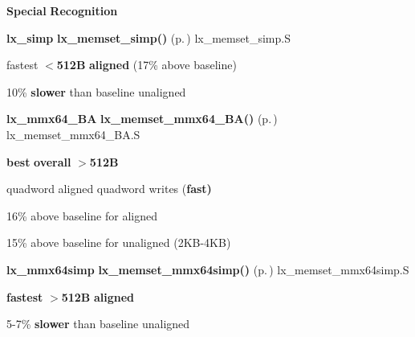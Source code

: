 {\bf Special} {\bf Recognition}\begin{CompactItemize}
\item 
{\bf lx\_\-simp} {\bf lx\_\-memset\_\-simp()} {\rm (p.\,\pageref{memset_2def__test_8h_a6})} lx\_\-memset\_\-simp.S\begin{CompactItemize}
\item 
fastest {\bf $<$512B} {\bf aligned} (17\% above baseline) \item 
10\% {\bf slower} than baseline unaligned\end{CompactItemize}
\item 
{\bf lx\_\-mmx64\_\-BA} {\bf lx\_\-memset\_\-mmx64\_\-BA()} {\rm (p.\,\pageref{memset_2def__test_8h_a12})} lx\_\-memset\_\-mmx64\_\-BA.S \begin{CompactItemize}
\item 
{\bf best} {\bf overall} {\bf $>$512B}\item 
quadword aligned quadword writes ({\bf fast)}\item 
16\% above baseline for aligned\item 
15\% above baseline for unaligned (2KB-4KB)\end{CompactItemize}
\item 
{\bf lx\_\-mmx64simp} {\bf lx\_\-memset\_\-mmx64simp()} {\rm (p.\,\pageref{memset_2def__test_8h_a11})} lx\_\-memset\_\-mmx64simp.S \begin{CompactItemize}
\item 
{\bf fastest} {\bf $>$512B} {\bf aligned}\item 
5-7\% {\bf slower} than baseline unaligned\end{CompactItemize}
\end{CompactItemize}
